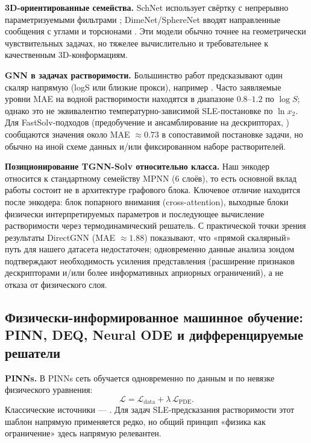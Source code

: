 \documentclass[11pt]{article}
\begin{document}
\textbf{3D-ориентированные семейства.} SchNet использует свёртку с непрерывно параметризуемыми фильтрами \cite{schutt2018}; DimeNet/SphereNet вводят направленные сообщения с углами и торсионами \cite{gasteiger2020,liu2022}. Эти модели обычно точнее на геометрически чувствительных задачах, но тяжелее вычислительно и требовательнее к качественным 3D-конформациям.

\textbf{GNN в задачах растворимости.} Большинство работ предсказывают один скаляр напрямую (logS или близкие прокси), например \cite{francoeur2021,ye2021}. Часто заявляемые уровни MAE на водной растворимости находятся в диапазоне $0.8$--$1.2$ по $\log S$; однако это не эквивалентно температурно-зависимой SLE-постановке по $\ln x_2$. Для FastSolv-подходов (предобучение и ансамблирование на дескрипторах, \cite{osanloo2024}) сообщаются значения около MAE $\approx 0.73$ в сопоставимой постановке задачи, но обычно на иной схеме данных и/или фиксированном наборе растворителей.

\textbf{Позиционирование TGNN-Solv относительно класса.} Наш энкодер относится к стандартному семейству MPNN (6 слоёв), то есть основной вклад работы состоит не в архитектуре графового блока. Ключевое отличие находится после энкодера: блок попарного внимания (cross-attention), выходные блоки физически интерпретируемых параметров и последующее вычисление растворимости через термодинамический решатель. С практической точки зрения результаты DirectGNN (MAE $\approx 1.88$) показывают, что «прямой скалярный» путь для нашего датасета недостаточен; одновременно данные анализа зондом подтверждают необходимость усиления представления (расширение признаков дескрипторами и/или более информативных априорных ограничений), а не отказа от физического слоя.

\subsection{Физически-информированное машинное обучение: PINN, DEQ, Neural ODE и дифференцируемые решатели}

\textbf{PINNs.} В PINNs сеть обучается одновременно по данным и по невязке физического уравнения:
\begin{equation*}
\mathcal{L}=\mathcal{L}_{\text{data}}+\lambda\,\mathcal{L}_{\text{PDE}}.
\end{equation*}
Классические источники --- \cite{raissi2019}. Для задач SLE-предсказания растворимости этот шаблон напрямую применяется редко, но общий принцип «физика как ограничение» здесь напрямую релевантен.
\end{document}
